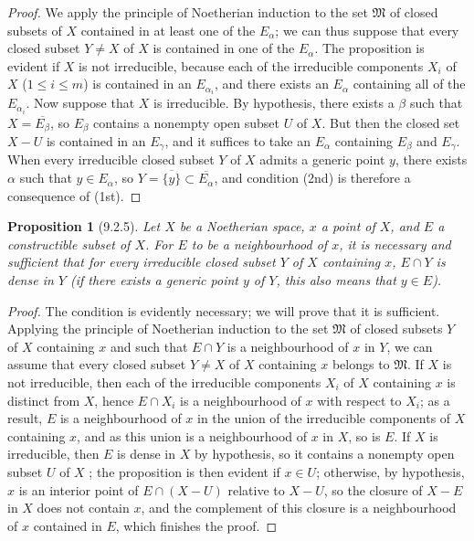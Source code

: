 \documentclass[oneside]{amsart}
\theoremstyle{ega-env-style}
\theoremstyle{ega-thm-env-style}
\newtheorem*{proposition}{Proposition}
\theoremstyle{ega-defn-env-style}
\def\leq{\leqslant}                 %
\def\setmin{-}                      %
\newcommand{\oldpage}[2][]{{\marginnote{\normalfont{\textbf{#1}~|~#2}}}\ignorespaces}
\let\EGAOriginalLabel\label
\renewcommand{\label}[1]{\phantomsection\EGAOriginalLabel{#1}}
\begin{document}
\begin{proof}
We apply the principle of Noetherian induction  to the set $\mathfrak{M}$ of closed subsets of $X$ contained in at least one of the $E_\alpha$; we can thus suppose that every closed subset $Y\neq X$ of $X$ is contained in one of the $E_\alpha$.
The proposition is evident if $X$ is not irreducible, because each of the irreducible components $X_i$ of $X$ ($1\leq i\leq m$) is contained in an $E_{\alpha_i}$, and there exists an $E_\alpha$ containing all of the $E_{\alpha_i}$.
Now suppose that $X$ is irreducible.
By hypothesis, there exists a $\beta$ such that $X=\overline{E_\beta}$, so  $E_\beta$ contains a nonempty open subset $U$ of $X$.
But then the closed set $X\setmin U$ is contained in an $E_\gamma$, and it suffices to take an $E_\alpha$ containing $E_\beta$ and $E_\gamma$.
When every irreducible closed subset $Y$ of $X$
\oldpage[0\textsubscript{III}]{16}
admits a generic point $y$, there exists $\alpha$ such that $y\in E_\alpha$, so $Y=\overline{\{y\}}\subset\overline{E_\alpha}$, and condition (2nd) is therefore a consequence of (1st).
\end{proof}

\begin{proposition}[9.2.5]
\label{0.9.2.5}
Let $X$ be a Noetherian space, $x$ a point of $X$, and $E$ a constructible subset of $X$.
For $E$ to be a neighbourhood of $x$, it is necessary and sufficient that for every irreducible closed subset $Y$ of $X$ containing $x$, $E\cap Y$ is dense in $Y$ (if there exists a generic point $y$ of $Y$, this also means  that $y\in E$).
\end{proposition}

\begin{proof}
The condition is evidently necessary; we will prove that it is sufficient.
Applying the principle of Noetherian induction to the set $\mathfrak{M}$ of closed subsets $Y$ of $X$ containing $x$ and such that $E\cap Y$ is a neighbourhood of $x$ in $Y$, we can assume that every closed subset $Y\neq X$ of $X$ containing $x$ belongs to $\mathfrak{M}$.
If $X$ is not irreducible, then each of the irreducible components $X_i$ of $X$ containing $x$ is distinct from $X$, hence $E\cap X_i$ is a neighbourhood of $x$ with respect to $X_i$; as a result, $E$ is a neighbourhood of $x$ in the union of the irreducible components of $X$ containing $x$, and as this union is a neighbourhood of $x$ in $X$, so is $E$.
If $X$ is irreducible, then $E$ is dense in $X$ by hypothesis, so it contains a nonempty open subset $U$ of $X$ ; the proposition is then evident if $x\in U$; otherwise, by hypothesis, $x$ is an interior point of $E\cap(X\setmin U)$ relative to $X\setmin U$, so the closure of $X\setmin E$ in $X$ does not contain $x$, and the complement of this closure is a neighbourhood of $x$ contained in $E$, which finishes the proof.
\end{proof}
\end{document}
